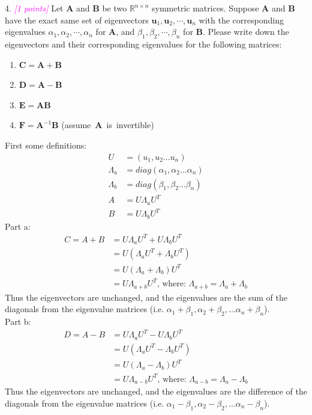 \documentclass{article}
\newcommand{\field}[1]{\mathbb{#1}}
\newcommand{\1}{\mathbf{1}}
\newcommand{\R}{\field{R}} %
\newcommand{\vct}[1]{\boldsymbol{#1}} %
\newcommand{\mat}[1]{\boldsymbol{#1}} %
\newcommand{\grade}[1]{\small\textcolor{magenta}{\emph{[#1 points]}} \normalsize}
\begin{document}
{\color{blue}
4. \grade{1} Let $\mat{A}$ and $\mat{B}$ be two $\R^{n\times n}$ symmetric
matrices. Suppose $\mat{A}$ and $\mat{B}$ have the exact same set of eigenvectors
$\vct{u}_1, \vct{u}_2, \cdots, \vct{u}_n$ with the corresponding
eigenvalues $\alpha_1, \alpha_2, \cdots, \alpha_{n}$ for $\mat{A}$, and
$\beta_1, \beta_2, \cdots, \beta_{n}$ for $\mat{B}$. Please write down
the eigenvectors and their corresponding eigenvalues for the following matrices:
\begin{enumerate}
\item $\mat{C} = \mat{A}+\mat{B}$
\item $\mat{D} = \mat{A} - \mat{B}$
\item $\mat{E} = \mat{A}\mat{B}$
\item $\mat{F} = \mat{A}^{-1}\mat{B}$ (\mbox{assume $\mat{A}$ is invertible})
\end{enumerate}
}
First some definitions:
\begin{align}
U & = (u_1, u_2 ... u_n) \\
    \Lambda_a & = diag(\alpha_1,\alpha_2...\alpha_n) \\
    \Lambda_b & = diag(\beta_1,\beta_2...\beta_n) \\
    A & = U\Lambda_aU^T\\
    B & = U\Lambda_bU^T 
\end{align}
Part a:
\begin{align}
    C = A + B & =  U\Lambda_aU^T +  U\Lambda_bU^T \\
    & =  U(\Lambda_aU^T +  \Lambda_bU^T) \\
    & =  U(\Lambda_a +  \Lambda_b)U^T \\
    & =  U\Lambda_{a+b}U^T \text{, where:  } \Lambda_{a+b} = \Lambda_a +  \Lambda_b
\end{align}
Thus the eigenvectors are unchanged, and the eigenvalues are the sum of the diagonals from the eigenvalue matrices (i.e. $\alpha_1 + \beta_1,\alpha_2 + \beta_2, ... \alpha_n + \beta_n $). \\

Part b: 
\begin{align}
    D = A - B & =  U\Lambda_aU^T -  U\Lambda_bU^T \\
    & =  U(\Lambda_aU^T -  \Lambda_bU^T) \\
    & =  U(\Lambda_a -  \Lambda_b)U^T \\
    & =  U\Lambda_{a-b}U^T \text{, where:  } \Lambda_{a-b} = \Lambda_a -  \Lambda_b
\end{align}
Thus the eigenvectors are unchanged, and the eigenvalues are the difference of the diagonals from the eigenvalue matrices (i.e. $\alpha_1 - \beta_1,\alpha_2 - \beta_2, ... \alpha_n - \beta_n $).  \\
\end{document}
